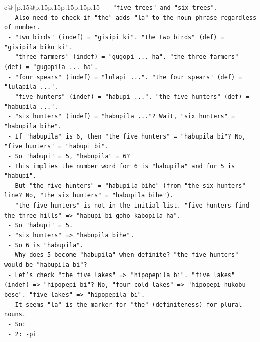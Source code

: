 \documentclass{article}
\begin{document}
{\begin{supertabular}{c@{$\;$}|p{.15\linewidth}@{}p{.15\linewidth}p{.15\linewidth}p{.15\linewidth}p{.15\linewidth}p{.15\linewidth}}
{{{\texttt{       {-} "five trees" and "six trees".} \\
\texttt{       {-} Also need to check if "the" adds "la" to the noun phrase regardless of number.} \\
\texttt{       {-} "two birds" (indef) = "gisipi ki". "the two birds" (def) = "gisipila biko ki".} \\
\texttt{       {-} "three farmers" (indef) = "gugopi ... ha". "the three farmers" (def) = "gugopila ... ha".} \\
\texttt{       {-} "four spears" (indef) = "lulapi ...". "the four spears" (def) = "lulapila ...".} \\
\texttt{       {-} "five hunters" (indef) = "habupi ...". "the five hunters" (def) = "habupila ...".} \\
\texttt{       {-} "six hunters" (indef) = "habupila ..."? Wait, "six hunters" = "habupila bihe".} \\
\texttt{       {-} If "habupila" is 6, then "the five hunters" = "habupila bi"? No, "five hunters" = "habupi bi".} \\
\texttt{       {-} So "habupi" = 5, "habupila" = 6?} \\
\texttt{       {-} This implies the number word for 6 is "habupila" and for 5 is "habupi".} \\
\texttt{       {-} But "the five hunters" = "habupila bihe" (from "the six hunters" line? No, "the six hunters" = "habupila bihe").} \\
\texttt{       {-} "the five hunters" is not in the initial list. "five hunters find the three hills" => "habupi bi goho kabopila ha".} \\
\texttt{       {-} So "habupi" = 5.} \\
\texttt{       {-} "six hunters" => "habupila bihe".} \\
\texttt{       {-} So 6 is "habupila".} \\
\texttt{       {-} Why does 5 become "habupila" when definite? "the five hunters" would be "habupila bi"?} \\
\texttt{       {-} Let's check "the five lakes" => "hipopepila bi". "five lakes" (indef) => "hipopepi bi"? No, "four cold lakes" => "hipopepi hukobu bese". "five lakes" => "hipopepila bi".} \\
\texttt{       {-} It seems "la" is the marker for "the" (definiteness) for plural nouns.} \\
\texttt{       {-} So:} \\
\texttt{         {-} 2: {-}pi} \\
}}}
\end{supertabular}}
\end{document}
